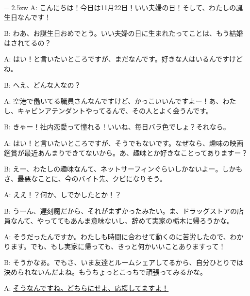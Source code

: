 \documentclass[11pt]{amsart}
\title{}
\author{}
\newenvironment{hangall}[1]{\hangindent = 2.5zw\everypar{\hangindent = 2.5zw}}{}
\begin{document}
\maketitle
\begin{hangall}{}%
A: こんにちは！今日は11月22日！いい夫婦の日！そして、わたしの誕生日なんです！

B: わあ、お誕生日おめでとう。いい夫婦の日に生まれたってことは、もう結婚はされてるの？

A: はい！と言いたいところですが、まだなんです。好きな人はいるんですけどね。

B: へえ、どんな人なの？

A: 空港で働いてる職員さんなんですけど、かっこいいんですよー！あ、わたし、キャビンアテンダントやってるんで、その人とよく会うんです。

B: きゃー！社内恋愛って憧れる！いいね、毎日バラ色でしょ？それなら。

A: はい！と言いたいところですが、そうでもないです。なぜなら、趣味の映画鑑賞が最近あんまりできてないから。あ、趣味とか好きなことってありますー？

B: えー、わたしの趣味なんて、ネットサーフィンぐらいしかないよー。しかもさ、最悪なことに、今のバイト先、クビになりそう。

A: ええ！？何か、しでかしたとか！？

B: うーん、遅刻魔だから、それがまずかったみたい。ま、ドラッグストアの店員なんて、やっててもあんま意味ないし、辞めて実家の栃木に帰ろうかな。

A: そうだったんですか。わたしも時間に合わせて動くのに苦労したので、わかります。でも、もし実家に帰っても、きっと何かいいことありますって！

B: そうかなあ。でもさ、いま友達とルームシェアしてるから、自分ひとりでは決められないんだよね。もうちょっとこっちで頑張ってみるかな。

A: \ul{そうなんですね。どちらにせよ、応援してますよ！}\end{hangall}
\end{document}
